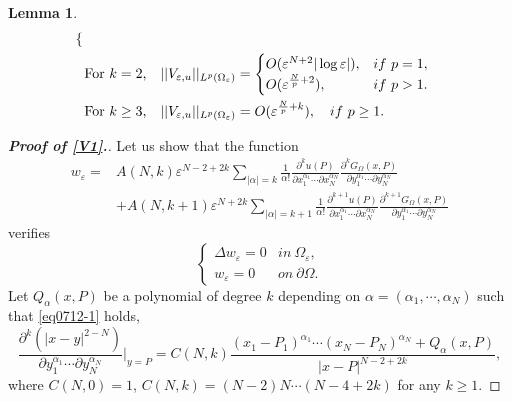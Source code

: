 \documentclass[10pt,a4paper]{amsart}
\newtheorem{lemma}{Lemma}
\renewcommand\O\Omega
\newcommand\e\varepsilon
\begin{document}
\begin{lemma}
\begin{equation}
\begin{aligned}
\begin{cases}
					\end{cases}\\
			&	\hbox{For $k= 2$,}\quad
					||V_{\e,u}||_{L^p(\O_\e)}=
					\begin{cases}
						O(\e^{N+2}|\log\e|), &if\  p=1,\\
						O(\e^{\frac{N}{p}+2}),   &if\  p>1.\\
					\end{cases}\\
		&	\hbox{For $k\ge 3$,}\quad
					||V_{\e,u}||_{L^p(\O_\e)}=	O(\e^{\frac{N}{p}+k}),\quad if \ p\ge 1.
				\end{aligned}
			\end{equation}
		\end{lemma}

		\begin{proof}[\bf Proof of \eqref{V1}.]
			Let us show that the function 
            \begin{equation}\label{eqwe}
				\begin{aligned}
					w_\e=&A(N,k)\e^{N-2+2k}	\sum_{|\alpha|=k}\frac1{\alpha!}
					\frac{\partial^ku(P)}{\partial x_1^{\alpha_1}\cdots\partial x_N^{\alpha_N}}
					\frac{\partial^kG_{\Omega}(x,P)}{\partial y_1^{\alpha_1}\cdots\partial y_N^{\alpha_N}}\\
					&+A(N,k+1)\e^{N+2k}	\sum_{|\alpha|=k+1}\frac1{\alpha!}
					\frac{\partial^{k+1}u(P)}{\partial x_1^{\alpha_1}\cdots\partial x_N^{\alpha_N}}
					\frac{\partial^{k+1}G_{\Omega}(x,P)}{\partial y_1^{\alpha_1}\cdots\partial y_N^{\alpha_N}}
				\end{aligned}      
            \end{equation}
			verifies
			\begin{equation}
				\begin{cases}
					\Delta w_\e=0&in\ \O_\e,\\
					w_\e=0&on\ \partial\O.
				\end{cases}
			\end{equation}
			  Let $Q_\alpha(x,P)$ be a polynomial of degree $k$ depending on $\alpha=(\alpha_1,\cdots,\alpha_N)$ such that \eqref{eq0712-1} holds,
				\begin{equation}\label{eq0712-1}
					\frac{\partial^k\left(|x-y|^{2-N}\right)}{\partial y_1^{\alpha_1}\cdots\partial y_N^{\alpha_N}}\Bigg|_{y=P}=C(N,k)\frac{(x_1-P_1)^{\alpha_1}\cdots(x_N-P_N)^{\alpha_N}+Q_\alpha(x,P)}
					{|x-P|^{N-2+2k}},
				\end{equation}
			where  $C(N,0)=1$, $C(N,k)=(N-2)N\cdots(N-4+2k)$ for any $k\ge 1$. 

\end{proof}
\end{document}
